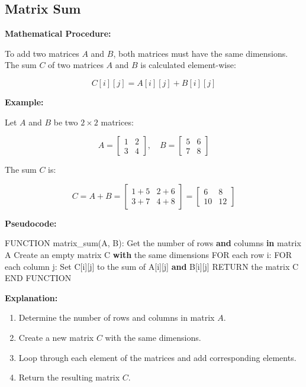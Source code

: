 \documentclass[
  letterpaper,
  DIV=11,
  numbers=noendperiod]{scrreprt}
\newenvironment{Shaded}{\begin{snugshade}}{\end{snugshade}}
\newcommand{\BuiltInTok}[1]{\textcolor[rgb]{0.00,0.23,0.31}{#1}}
\newcommand{\ControlFlowTok}[1]{\textcolor[rgb]{0.00,0.23,0.31}{\textbf{#1}}}
\newcommand{\KeywordTok}[1]{\textcolor[rgb]{0.00,0.23,0.31}{\textbf{#1}}}
\newcommand{\NormalTok}[1]{\textcolor[rgb]{0.00,0.23,0.31}{#1}}
\providecommand{\tightlist}{%
  \setlength{\itemsep}{0pt}\setlength{\parskip}{0pt}}\usepackage{longtable,booktabs,array}
\theoremstyle{plain}
\theoremstyle{definition}
\theoremstyle{remark}
\begin{document}
\subsection{Matrix Sum}\label{matrix-sum}

\textbf{Mathematical Procedure:}

To add two matrices \(A\) and \(B\), both matrices must have the same
dimensions. The sum \(C\) of two matrices \(A\) and \(B\) is calculated
element-wise:

\[C[i][j] = A[i][j] + B[i][j]\]

\textbf{Example:}

Let \(A\) and \(B\) be two \(2 \times 2\) matrices:

\[ A = \begin{bmatrix} 1 & 2 \\ 3 & 4 \end{bmatrix}, \quad B = \begin{bmatrix} 5 & 6 \\ 7 & 8 \end{bmatrix} \]

The sum \(C\) is:

\[ C = A + B = \begin{bmatrix} 1+5 & 2+6 \\ 3+7 & 4+8 \end{bmatrix} = \begin{bmatrix} 6 & 8 \\ 10 & 12 \end{bmatrix} \]

\textbf{Pseudocode:}

\begin{Shaded}
\begin{Highlighting}[]
\NormalTok{FUNCTION matrix\_sum(A, B):}
\NormalTok{    Get the number of rows }\KeywordTok{and}\NormalTok{ columns }\KeywordTok{in}\NormalTok{ matrix A}
\NormalTok{    Create an empty matrix C }\ControlFlowTok{with}\NormalTok{ the same dimensions}
\NormalTok{    FOR each row i:}
\NormalTok{        FOR each column j:}
\NormalTok{            Set C[i][j] to the }\BuiltInTok{sum}\NormalTok{ of A[i][j] }\KeywordTok{and}\NormalTok{ B[i][j]}
\NormalTok{    RETURN the matrix C}
\NormalTok{END FUNCTION}
\end{Highlighting}
\end{Shaded}

\textbf{Explanation:}

\begin{enumerate}
\def\labelenumi{\arabic{enumi}.}
\tightlist
\item
  Determine the number of rows and columns in matrix \(A\).
\item
  Create a new matrix \(C\) with the same dimensions.
\item
  Loop through each element of the matrices and add corresponding
  elements.
\item
  Return the resulting matrix \(C\).
\end{enumerate}
\end{document}
